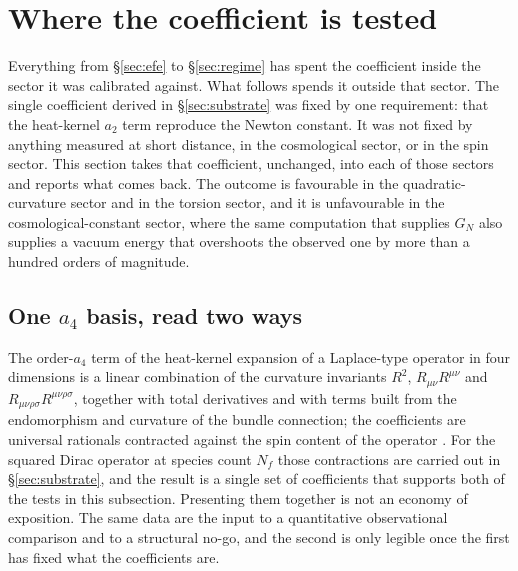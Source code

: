 \documentclass[aps,prd,nofootinbib,superscriptaddress,12pt]{revtex4-2}
\begin{document}
\section{Where the coefficient is tested}
\label{sec:tests}

Everything from \S\ref{sec:efe} to \S\ref{sec:regime} has spent the coefficient
inside the sector it was calibrated against. What follows spends it outside that
sector. The single coefficient derived in \S\ref{sec:substrate} was fixed by one
requirement: that the heat-kernel $a_2$ term reproduce the Newton constant. It
was not fixed by anything measured at short distance, in the cosmological
sector, or in the spin sector. This section takes that coefficient, unchanged,
into each of those sectors and reports what comes back. The outcome is
favourable in the quadratic-curvature sector and in the torsion sector, and it
is unfavourable in the cosmological-constant sector, where the same computation
that supplies $G_N$ also supplies a vacuum energy that overshoots the observed
one by more than a hundred orders of magnitude.

\subsection{One $a_4$ basis, read two ways}
\label{sec:a4-two-ways}

The order-$a_4$ term of the heat-kernel expansion of a Laplace-type operator in
four dimensions is a linear combination of the curvature invariants $R^2$,
$R_{\mu\nu}R^{\mu\nu}$ and $R_{\mu\nu\rho\sigma}R^{\mu\nu\rho\sigma}$, together
with total derivatives and with terms built from the endomorphism and curvature
of the bundle connection; the coefficients are universal rationals contracted
against the spin content of the operator
\cite[Eq.~(4.15) and Eq.~(4.28)]{Vassilevich2003}. For the squared Dirac
operator at species count $N_f$ those contractions are carried out in
\S\ref{sec:substrate}, and the result is a single set of coefficients that
supports both of the tests in this subsection. Presenting them together is not
an economy of exposition. The same data are the input to a quantitative
observational comparison and to a structural no-go, and the second is only
legible once the first has fixed what the coefficients are.
\end{document}
